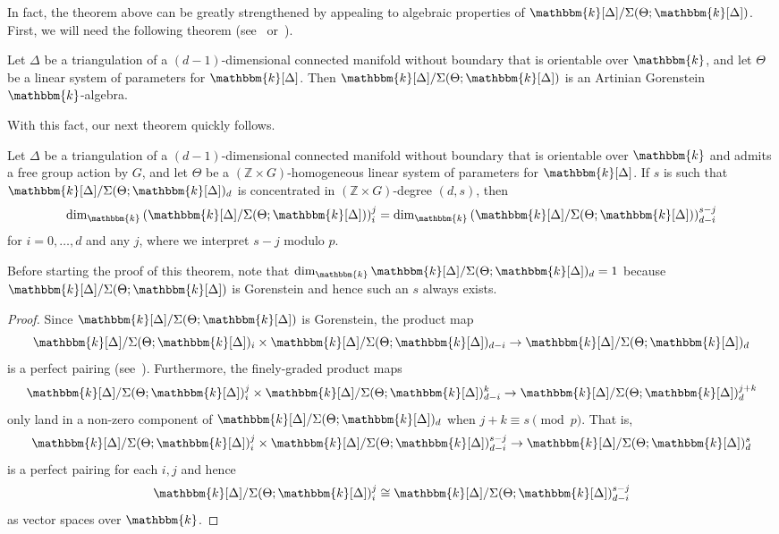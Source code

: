 \documentclass[ALCO,ThmDefs,Unicode]{cedram}
\newcommand{\field}{\mathbbm{k}}
\newcommand{\ZZ}{{\mathbb Z}}
\begin{document}
In fact, the theorem above can be greatly strengthened by appealing to algebraic properties of $\field[\Delta]/\Sigma(\Theta;\field[\Delta])$. First, we will need the following theorem (see~\cite[Theorem~1.4]{NS-Gorenstein} or~\cite[Remark~3.8]{BBMD}).

\begin{theo}
Let $\Delta$ be a triangulation of a $(d-1)$-dimensional connected manifold without boundary that is orientable over $\field$, and let $\Theta$ be a linear system of parameters for $\field[\Delta]$. Then $\field[\Delta]/\Sigma(\Theta;\field[\Delta])$ is an Artinian Gorenstein $\field$-algebra.
\end{theo}

With this fact, our next theorem quickly follows.

\begin{theo}\label{DSTheorem2}
Let $\Delta$ be a triangulation of a $(d-1)$-dimensional connected manifold without boundary that is orientable over $\field$ and admits a free group action by $G$, and let $\Theta$ be a $(\ZZ\times G)$-homogeneous linear system of parameters for $\field[\Delta]$. If $s$ is such that $\field[\Delta]/\Sigma(\Theta;\field[\Delta])_d$ is concentrated in $(\ZZ\times G)$-degree $(d, s)$, then
\[
\dim_\field \left(\field[\Delta]/\Sigma(\Theta;\field[\Delta])\right)_i^j = \dim_\field \left(\field[\Delta]/\Sigma(\Theta;\field[\Delta])\right)_{d-i}^{s-j}
\]
for $i=0, \ldots, d$ and any $j$, where we interpret $s-j$ modulo $p$.
\end{theo}

Before starting the proof of this theorem, note that $\dim_{\field}\field[\Delta]/\Sigma(\Theta;\field[\Delta])_d=1$ because $\field[\Delta]/\Sigma(\Theta;\field[\Delta])$ is Gorenstein and hence such an $s$ always exists.

\begin{proof}
Since $\field[\Delta]/\Sigma(\Theta;\field[\Delta])$ is Gorenstein, the product map
\[
\field[\Delta]/\Sigma(\Theta;\field[\Delta])_i \times \field[\Delta]/\Sigma(\Theta;\field[\Delta])_{d-i} \to \field[\Delta]/\Sigma(\Theta;\field[\Delta])_d
\]
is a perfect pairing (see~\cite[Theorem~2.79]{LefschetzProperties}). Furthermore, the finely-graded product maps
\[
\field[\Delta]/\Sigma(\Theta;\field[\Delta])_i^j \times \field[\Delta]/\Sigma(\Theta;\field[\Delta])_{d-i}^k \to \field[\Delta]/\Sigma(\Theta;\field[\Delta])_d^{j+k}
\]
only land in a non-zero component of $\field[\Delta]/\Sigma(\Theta;\field[\Delta])_d$ when $j+k\equiv s \pmod p$. That is,
\[
\field[\Delta]/\Sigma(\Theta;\field[\Delta])_i^j \times \field[\Delta]/\Sigma(\Theta;\field[\Delta])_{d-i}^{s-j} \to \field[\Delta]/\Sigma(\Theta;\field[\Delta])_d^{s}
\]
is a perfect pairing for each $i, j$ and hence
\[
\field[\Delta]/\Sigma(\Theta;\field[\Delta])_i^j \cong \field[\Delta]/\Sigma(\Theta;\field[\Delta])_{d-i}^{s-j}
\]
as vector spaces over $\field$.
\end{proof}
\end{document}
